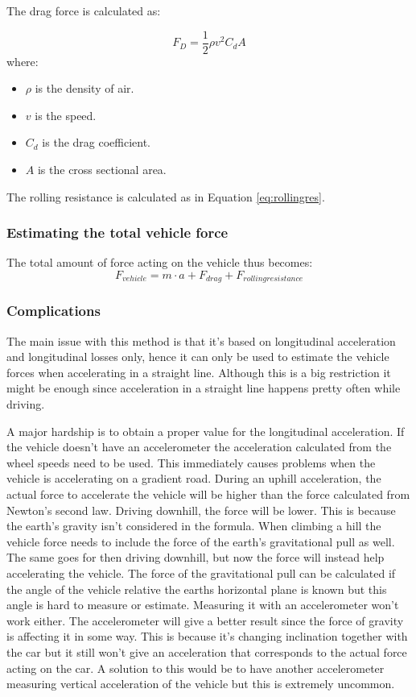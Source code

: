 The drag force is calculated as:

\begin{equation}
F_{D}=\frac{1}{2}\rho v^2 C_{d}A
\end{equation}
where:
\begin{itemize}
	\item $ \rho $ is the density of air.
	\item $ v $ is the speed.
	\item $ C_{d} $ is the drag coefficient.
	\item $ A $ is the cross sectional area.
\end{itemize}
The rolling resistance is calculated as in Equation \ref{eq:rollingres}.

\subsubsection{Estimating the total vehicle force}
The total amount of force acting on the vehicle thus becomes:
\begin{equation}
\label{eq:newton}
F_{vehicle} = m \cdot a + F_{drag} + F_{rolling resistance}
\end{equation}

\subsubsection{Complications}
The main issue with this method is that it's based on longitudinal acceleration and longitudinal losses only, hence it can only be used to estimate the vehicle forces when accelerating in a straight line. Although this is a big restriction it might be enough since acceleration in a straight line happens pretty often while driving.

A major hardship is to obtain a proper value for the longitudinal acceleration. If the vehicle doesn't have an accelerometer the acceleration calculated from the wheel speeds need to be used. This immediately causes problems when the vehicle is accelerating on a gradient road. During an uphill acceleration, the actual force to accelerate the vehicle will be higher than the force calculated from Newton's second law. Driving downhill, the force will be lower. This is because the earth's gravity isn't considered in the formula. When climbing a hill the vehicle force needs to include the force of the earth's gravitational pull as well. The same goes for then driving downhill, but now the force will instead help accelerating the vehicle. The force of the gravitational pull can be calculated if the angle of the vehicle relative the earths horizontal plane is known but this angle is hard to measure or estimate. Measuring it with an accelerometer won't work either. The accelerometer will give a better result since the force of gravity is affecting it in some way. This is because it's changing inclination together with the car but it still won't give an acceleration that corresponds to the actual force acting on the car. A solution to this would be to have another accelerometer measuring vertical acceleration of the vehicle but this is extremely uncommon.

